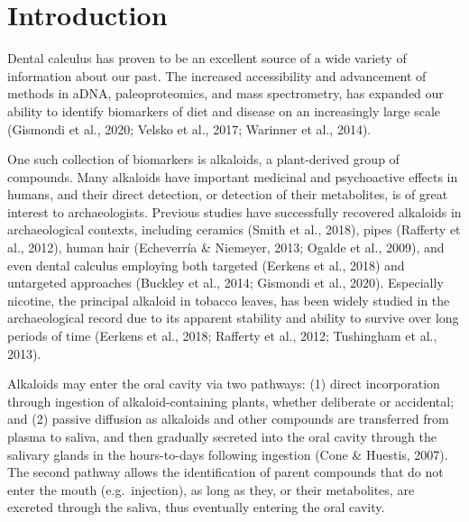 \documentclass[
]{article}
\begin{document}
\section{Introduction}\label{introduction}

Dental calculus has proven to be an excellent source of a wide variety
of information about our past. The increased accessibility and
advancement of methods in aDNA, paleoproteomics, and mass spectrometry,
has expanded our ability to identify biomarkers of diet and disease on
an increasingly large scale (Gismondi et al., 2020; Velsko et al., 2017;
Warinner et al., 2014).

One such collection of biomarkers is alkaloids, a plant-derived group of
compounds. Many alkaloids have important medicinal and psychoactive
effects in humans, and their direct detection, or detection of their
metabolites, is of great interest to archaeologists. Previous studies
have successfully recovered alkaloids in archaeological contexts,
including ceramics (Smith et al., 2018), pipes (Rafferty et al., 2012),
human hair (Echeverría \& Niemeyer, 2013; Ogalde et al., 2009), and even
dental calculus employing both targeted (Eerkens et al., 2018) and
untargeted approaches (Buckley et al., 2014; Gismondi et al., 2020).
Especially nicotine, the principal alkaloid in tobacco leaves, has been
widely studied in the archaeological record due to its apparent
stability and ability to survive over long periods of time (Eerkens et
al., 2018; Rafferty et al., 2012; Tushingham et al., 2013).

Alkaloids may enter the oral cavity via two pathways: (1) direct
incorporation through ingestion of alkaloid-containing plants, whether
deliberate or accidental; and (2) passive diffusion as alkaloids and
other compounds are transferred from plasma to saliva, and then
gradually secreted into the oral cavity through the salivary glands in
the hours-to-days following ingestion (Cone \& Huestis, 2007). The
second pathway allows the identification of parent compounds that do not
enter the mouth (e.g.~injection), as long as they, or their metabolites,
are excreted through the saliva, thus eventually entering the oral
cavity.
\end{document}

